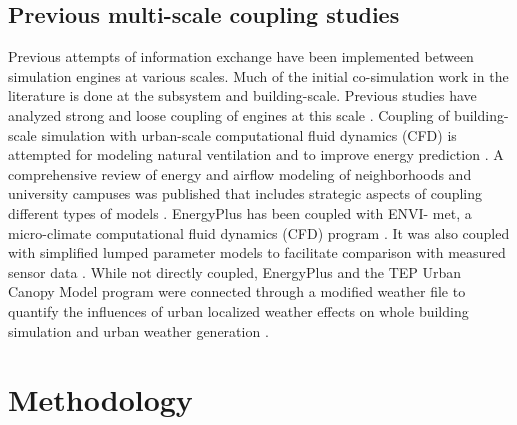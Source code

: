\documentclass{tBPS2e}
\theoremstyle{plain}
\theoremstyle{definition}
\theoremstyle{remark}
\newcommand{\noteDT}[1]{\footnote{\textcolor{green}{#1}}}
\begin{document}
\subsection{Previous multi-scale coupling studies}
Previous attempts of information exchange have been implemented between
simulation engines at various scales. Much of the initial co-simulation work
in the literature is done at the subsystem and building-scale. Previous studies
have analyzed strong and loose coupling of engines at this scale
\citep{wetter_co-simulation_2011,trcka_co-simulation_2010}. Coupling of building-scale simulation with
urban-scale computational fluid dynamics (CFD) is attempted for modeling
natural ventilation \citep{zhang_coupled_2013} and to improve energy prediction
\citep{bouyer_microclimatic_2011}. A comprehensive review of energy and airflow modeling
of neighborhoods and university campuses was published that includes
strategic aspects of coupling different %
types of models \citep{srebric_building_2015}. EnergyPlus has been coupled with ENVI-
met, a micro-climate computational fluid dynamics (CFD) program
\citep{yang_integrated_2012}. It was also coupled with simplified lumped parameter
models to facilitate comparison with measured sensor data
\citep{martin_estimation_2015}. While not directly coupled, EnergyPlus and the TEP Urban Canopy Model program were connected
through a modified weather file to quantify the influences of urban localized weather effects
on whole building simulation \citep{bueno_combining_2011} and urban weather generation
\citep{bueno_urban_2013}.

\section{Methodology}
\label{Methodology}
\end{document}
